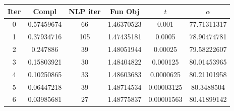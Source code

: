 \begin{tabular}{c c c c c c}
\toprule
Iter & Compl & NLP iter & Fun Obj & $t$ & $\alpha$ \\
\midrule
0 & 0.57459674 & 66 & 1.46370523 & 0.001 & 77.71311317 \\
1 & 0.37934716 & 105 & 1.47435181 & 0.0005 & 78.90474781 \\
2 & 0.247886 & 39 & 1.48051944 & 0.00025 & 79.58222607 \\
3 & 0.15803921 & 30 & 1.48404822 & 0.000125 & 80.01453965 \\
4 & 0.10250865 & 33 & 1.48603683 & 0.0000625 & 80.21101958 \\
5 & 0.06447218 & 39 & 1.48714534 & 0.00003125 & 80.3488504 \\
6 & 0.03985681 & 27 & 1.48775837 & 0.00001563 & 80.41899142 \\
\bottomrule
\end{tabular}